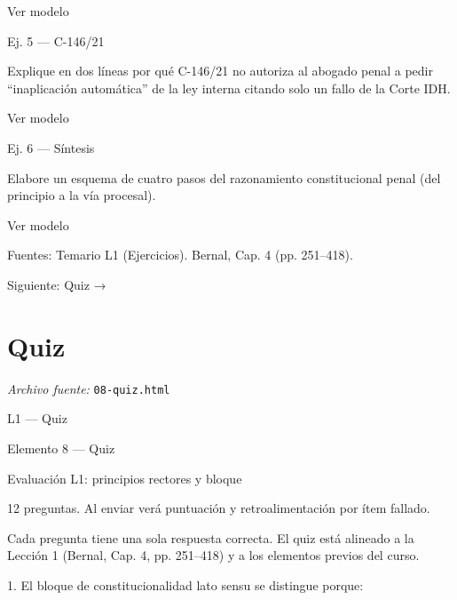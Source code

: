 \documentclass[11pt,a4paper]{article}
\begin{document}
      Ver modelo\par





      Ej. 5 — C-146/21\par

      Explique en dos líneas por qué C-146/21 no autoriza al abogado penal a pedir “inaplicación automática” de la ley interna citando solo un fallo de la Corte IDH.\par

      Ver modelo\par





      Ej. 6 — Síntesis\par

      Elabore un esquema de cuatro pasos del razonamiento constitucional penal (del principio a la vía procesal).\par

      Ver modelo\par





      Fuentes: Temario L1 (Ejercicios). Bernal, Cap. 4 (pp. 251–418).\par


    Siguiente: Quiz →\par

\section{Quiz}
\noindent\textit{Archivo fuente:} \texttt{08-quiz.html}

L1 — Quiz\par





    Elemento 8 — Quiz\par
    Evaluación L1: principios rectores y bloque\par

    12 preguntas. Al enviar verá puntuación y retroalimentación por ítem fallado.\par


      Cada pregunta tiene una sola respuesta correcta. El quiz está alineado a la Lección 1 (Bernal, Cap. 4, pp. 251–418) y a los elementos previos del curso.\par




        1. El bloque de constitucionalidad lato sensu se distingue porque:\par
\end{document}
